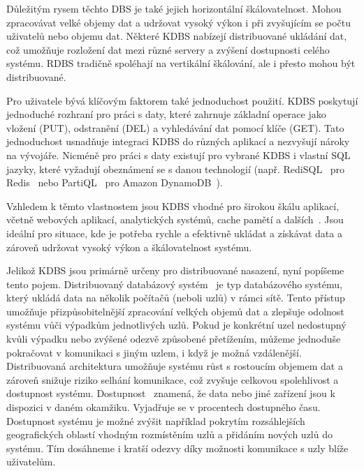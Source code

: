 \documentclass[czech,master,dept460,male,csharp,cpdeclaration]{diploma}
\begin{document}
	Důležitým rysem těchto DBS je také jejich horizontální škálovatelnost. Mohou zpracovávat velké objemy dat a udržovat vysoký výkon i při zvyšujícím se počtu uživatelů nebo objemu dat. Některé KDBS nabízejí distribuované ukládání dat, což umožňuje rozložení dat mezi různé servery a zvýšení dostupnosti celého systému. RDBS tradičně spoléhají na vertikální škálování, ale i přesto mohou být distribuované.
	
	Pro uživatele bývá klíčovým faktorem také jednoduchost použití. KDBS poskytují jednoduché rozhraní pro práci s daty, které zahrnuje základní operace jako vložení (PUT), odstranění (DEL) a vyhledávání dat pomocí klíče (GET). Tato jednoduchost usnadňuje integraci KDBS do různých aplikací a nezvyšují nároky na vývojáře. Nicméně pro práci s daty existují pro vybrané KDBS i vlastní SQL jazyky, které vyžadují obeznámení se s danou technologií (např. RediSQL~\cite{redisql} pro Redis~\cite{redis} nebo PartiQL~\cite{partiql} pro Amazon DynamoDB~\cite{dynamodb}).
	
	Vzhledem k těmto vlastnostem jsou KDBS vhodné pro širokou škálu aplikací, včetně webových aplikací, analytických systémů, cache pamětí a dalších~\cite{kdbs-memory, common-use-kdbs}. Jsou ideální pro situace, kde je potřeba rychle a efektivně ukládat a získávat data a zároveň udržovat vysoký výkon a škálovatelnost systému.
	
	Jelikož KDBS jsou primárně určeny pro distribuované nasazení, nyní popíšeme tento pojem. Distribuovaný databázový systém~\cite{ddbs} je typ databázového systému, který ukládá data na několik počítačů (neboli uzlů) v rámci sítě. Tento přístup umožňuje přizpůsobitelnější zpracování velkých objemů dat a zlepšuje odolnost systému vůči výpadkům jednotlivých uzlů. Pokud je konkrétní uzel nedostupný kvůli výpadku nebo zvýšené odezvě způsobené přetížením, můžeme jednoduše pokračovat v komunikaci s jiným uzlem, i když je možná vzdálenější. Distribuovaná architektura umožňuje systému růst s rostoucím objemem dat a zároveň snižuje riziko selhání komunikace, což zvyšuje celkovou spolehlivost a dostupnost systému. Dostupnost~\cite{availability} znamená, že data nebo jiné zařízení jsou k dispozici v daném okamžiku. Vyjadřuje se v procentech dostupného času. Dostupnost systému je možné zvýšit například pokrytím rozsáhlejších geografických oblastí vhodným rozmístěním uzlů a přidáním nových uzlů do systému. Tím dosáhneme i kratší odezvy díky možnosti komunikace s uzly blíže uživatelům.
	
\end{document}
